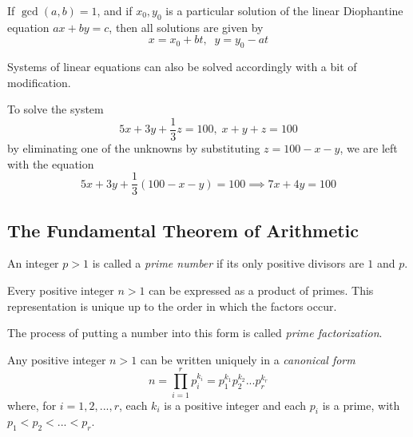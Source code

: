 \documentclass{article}
\newcounter{theorem}[section]
\newcounter{definition}[section]
\newcounter{example}[section]
\begin{document}
\begin{corollary}
  \label{thm:solutions-of-a-coprime-linear-diophantine}
If $\gcd(a, b) = 1$, and if $x_0, y_0$ is a particular solution of the linear Diophantine equation $ax + by = c$, then all solutions are given by
\begin{equation}
  x = x_0 + bt, \;\; y = y_0 - at
\end{equation}
\end{corollary}

Systems of linear equations can also be solved accordingly with a bit of modification. 

\begin{example}
  \label{ex:diophantine-system-by-substitution}
To solve the system 
\begin{equation}
  5x + 3y + \frac{1}{3}z = 100, \; x + y + z = 100
\end{equation}
by eliminating one of the unknowns by substituting $z = 100 - x - y$, we are left with the equation 
\begin{equation}
  5x + 3y + \frac{1}{3} (100-x-y) = 100 \implies 7x + 4y = 100
\end{equation}
\end{example}

\subsection{The Fundamental Theorem of Arithmetic}

\begin{definition}
  \label{def:prime-number}
An integer $p > 1$ is called a \textit{prime number} if its only positive divisors are $1$ and $p$.
\end{definition}

\begin{theorem}
  \label{thm:fundamental-theorem-of-arithmetic}
Every positive integer $n>1$ can be expressed as a product of primes. This representation is unique up to the order in which the factors occur. 
\end{theorem}

The process of putting a number into this form is called \textit{prime factorization}. 

\begin{corollary}
  \label{thm:canonical-prime-factorization}
Any positive integer $n>1$ can be written uniquely in a \textit{canonical form}
\begin{equation}
  n = \prod_{i=1}^r p_i^{k_i} = p_1^{k_1} p_2^{k_2}... p_r^{k_r}
\end{equation}
where, for $i=1, 2, ..., r$, each $k_i$ is a positive integer and each $p_i$ is a prime, with $p_1 < p_2 < ... < p_r$. 
\end{corollary}
\end{document}
